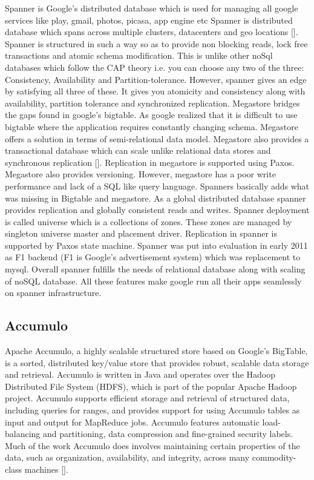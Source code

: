 Spanner is Google's distributed database which is used for managing
all google services like play, gmail, photos, picasa, app engine etc
Spanner is distributed database which spans across multiple clusters,
datacenters and geo locations [\cite{corbett-spanner}].  Spanner is
structured in such a way so as to provide non blocking reads, lock
free transactions and atomic schema modification. This is unlike other
noSql databases which follow the CAP theory i.e. you can choose any
two of the three: Consistency, Availability and
Partition-tolerance. However, spanner gives an edge by satisfying all
three of these. It gives you atomicity and consistency along with
availability, partition tolerance and synchronized replication.
Megastore bridges the gaps found in google's bigtable. As google
realized that it is difficult to use bigtable where the application
requires constantly changing schema. Megastore offers a solution in
terms of semi-relational data model.  Megastore also provides a
transactional database which can scale unlike relational data stores
and synchronous replication [\cite{www-magastore-spanner}].  Replication
in megastore is supported using Paxos. Megastore also provides
versioning. However, megastore has a poor write performance and lack
of a SQL like query language. Spanners basically adds what was missing
in Bigtable and megastore. As a global distributed database spanner
provides replication and globally consistent reads and writes. Spanner
deployment is called universe which is a collections of zones. These
zones are managed by singleton universe master and placement
driver. Replication in spanner is supported by Paxos state
machine. Spanner was put into evaluation in early 2011 as F1 backend
(F1 is Google's advertisement system) which was replacement to
mysql. Overall spanner fulfills the needs of relational database along
with scaling of noSQL database.  All these features make google run
all their apps seamlessly on spanner infrastructure.



\subsection{Accumulo}

Apache Accumulo, a highly scalable structured store based on Google's
BigTable, is a sorted, distributed key/value store that provides
robust, scalable data storage and retrieval. Accumulo is written in
Java and operates over the Hadoop Distributed File System (HDFS),
which is part of the popular Apache Hadoop project. Accumulo supports
efficient storage and retrieval of structured data, including queries
for ranges, and provides support for using Accumulo tables as input
and output for MapReduce jobs.  Accumulo features automatic
load-balancing and partitioning, data compression and fine-grained
security labels. Much of the work Accumulo does involves maintaining
certain properties of the data, such as organization, availability,
and integrity, across many commodity-class
machines [\cite{apache-accumulo}].

